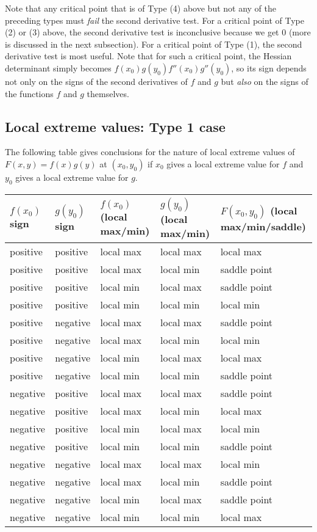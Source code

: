 \documentclass[10pt]{amsart}
\begin{document}
Note that any critical point that is of Type (4) above but not any of
the preceding types must {\em fail} the second derivative test. For a
critical point of Type (2) or (3) above, the second derivative test is
inconclusive because we get $0$ (more is discussed in the next
subsection). For a critical point of Type (1), the second derivative
test is most useful. Note that for such a critical point, the Hessian
determinant simply becomes $f(x_0)g(y_0)f''(x_0)g''(y_0)$, so its sign
depends not only on the signs of the second derivatives of $f$ and $g$
but {\em also} on the signs of the functions $f$ and $g$ themselves.

\subsection{Local extreme values: Type 1 case}

The following table gives conclusions for the nature of local extreme
values of $F(x,y) = f(x)g(y)$ at $(x_0,y_0)$ if $x_0$ gives a local
extreme value for $f$ and $y_0$ gives a local extreme value for $g$.

\begin{tabular}{|l|l|l|l|l|}
  \hline
  $f(x_0)$ sign & $g(y_0)$ sign & $f(x_0)$ (local max/min) & $g(y_0)$ (local max/min) & $F(x_0,y_0)$ (local max/min/saddle)\\
  \hline
  positive & positive & local max & local max & local max\\
  \hline
  positive & positive & local max & local min & saddle point \\
  \hline
  positive & positive & local min & local max & saddle point \\
  \hline
  positive & positive & local min & local min & local min \\
  \hline
  positive & negative & local max & local max & saddle point\\
  \hline
  positive & negative & local max & local min & local min\\
  \hline
  positive & negative & local min & local max & local max\\
  \hline
  positive & negative & local min & local min & saddle point\\
  \hline
  negative & positive & local max & local max & saddle point\\
  \hline
  negative & positive & local max & local min & local max \\
  \hline
  negative & positive & local min & local max & local min \\
  \hline
  negative & positive & local min & local min & saddle point \\
  \hline
  negative & negative & local max & local max & local min \\
  \hline
  negative & negative & local max & local min & saddle point \\
  \hline
  negative & negative & local min & local max & saddle point \\
  \hline
  negative & negative & local min & local min & local max \\
  \hline
\end{tabular}
\end{document}
